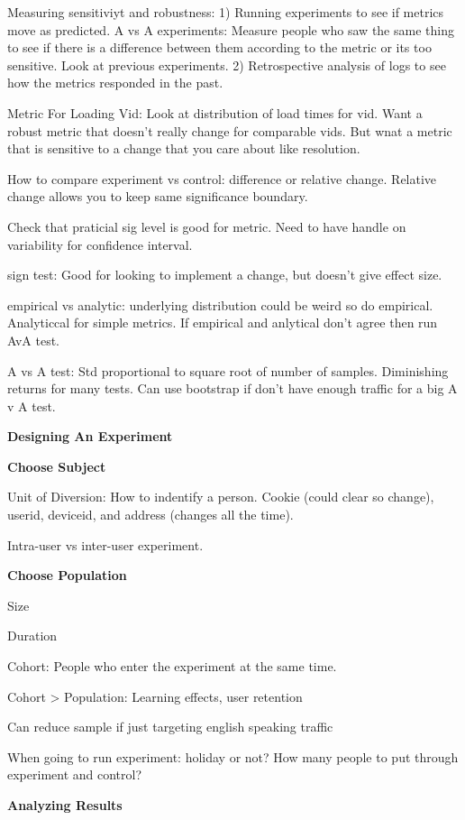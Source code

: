 \documentclass[]{book}
\begin{document}
Measuring sensitiviyt and robustness: 1) Running experiments to see if
metrics move as predicted. A vs A experiments: Measure people who saw
the same thing to see if there is a difference between them according to
the metric or its too sensitive. Look at previous experiments. 2)
Retrospective analysis of logs to see how the metrics responded in the
past.

Metric For Loading Vid: Look at distribution of load times for vid. Want
a robust metric that doesn't really change for comparable vids. But wnat
a metric that is sensitive to a change that you care about like
resolution.

How to compare experiment vs control: difference or relative change.
Relative change allows you to keep same significance boundary.

Check that praticial sig level is good for metric. Need to have handle
on variability for confidence interval.

sign test: Good for looking to implement a change, but doesn't give
effect size.

empirical vs analytic: underlying distribution could be weird so do
empirical. Analyticcal for simple metrics. If empirical and anlytical
don't agree then run AvA test.

A vs A test: Std proportional to square root of number of samples.
Diminishing returns for many tests. Can use bootstrap if don't have
enough traffic for a big A v A test.

\textbf{Designing An Experiment}

\textbf{Choose Subject}

Unit of Diversion: How to indentify a person. Cookie (could clear so
change), userid, deviceid, and address (changes all the time).

Intra-user vs inter-user experiment.

\textbf{Choose Population}

Size

Duration

Cohort: People who enter the experiment at the same time.

Cohort \textgreater{} Population: Learning effects, user retention

Can reduce sample if just targeting english speaking traffic

When going to run experiment: holiday or not? How many people to put
through experiment and control?

\textbf{Analyzing Results}
\end{document}
